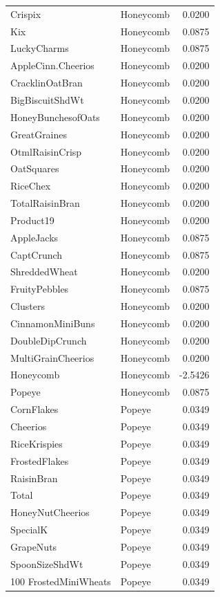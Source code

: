 \begin{longtable}{llr}
Crispix & Honeycomb & 0.0200 \\
Kix & Honeycomb & 0.0875 \\
LuckyCharms & Honeycomb & 0.0875 \\
AppleCinn.Cheerios & Honeycomb & 0.0200 \\
CracklinOatBran & Honeycomb & 0.0200 \\
BigBiscuitShdWt & Honeycomb & 0.0200 \\
HoneyBunchesofOats & Honeycomb & 0.0200 \\
GreatGraines & Honeycomb & 0.0200 \\
OtmlRaisinCrisp & Honeycomb & 0.0200 \\
OatSquares & Honeycomb & 0.0200 \\
RiceChex & Honeycomb & 0.0200 \\
TotalRaisinBran & Honeycomb & 0.0200 \\
Product19 & Honeycomb & 0.0200 \\
AppleJacks & Honeycomb & 0.0875 \\
CaptCrunch & Honeycomb & 0.0875 \\
ShreddedWheat & Honeycomb & 0.0200 \\
FruityPebbles & Honeycomb & 0.0875 \\
Clusters & Honeycomb & 0.0200 \\
CinnamonMiniBuns & Honeycomb & 0.0200 \\
DoubleDipCrunch & Honeycomb & 0.0200 \\
MultiGrainCheerios & Honeycomb & 0.0200 \\
Honeycomb & Honeycomb & -2.5426 \\
Popeye & Honeycomb & 0.0875 \\
CornFlakes & Popeye & 0.0349 \\
Cheerios & Popeye & 0.0349 \\
RiceKrispies & Popeye & 0.0349 \\
FrostedFlakes & Popeye & 0.0349 \\
RaisinBran & Popeye & 0.0349 \\
Total & Popeye & 0.0349 \\
HoneyNutCheerios & Popeye & 0.0349 \\
SpecialK & Popeye & 0.0349 \\
GrapeNuts & Popeye & 0.0349 \\
SpoonSizeShdWt & Popeye & 0.0349 \\
100%
FrostedMiniWheats & Popeye & 0.0349 \\

\end{longtable}
